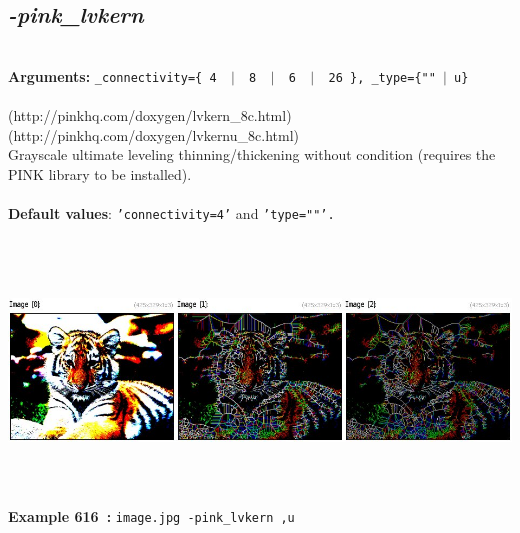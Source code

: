 \documentclass[a4paper,11pt,twoside]{book}
\begin{document}
\subsection{\emph{-pink\_lvkern} }\vspace*{-0.5em}
~\\\textbf{Arguments: } 
{\small \texttt{\_connectivity=\{ 4 ~$|$~ 8 ~$|$~ 6 ~$|$~ 26 \}, \_type=\{""~$|$~u\}}}\\~\\
(http://pinkhq.com/doxygen/lvkern\_8c.html)
~\\(http://pinkhq.com/doxygen/lvkernu\_8c.html)
~\\Grayscale ultimate leveling thinning/thickening without condition (requires the PINK library to be installed).
~\\~\\\textbf{Default values}: {\small \texttt{'connectivity=4'} and \texttt{'type=""'.}}
\begin{center}\includegraphics[keepaspectratio=true,height=7cm,width=\textwidth]{img/gmic_def616.jpg}\\
{\footnotesize \textbf{Example 616~:} \texttt{image.jpg -pink\_lvkern ,u}}
\end{center}
\end{document}
